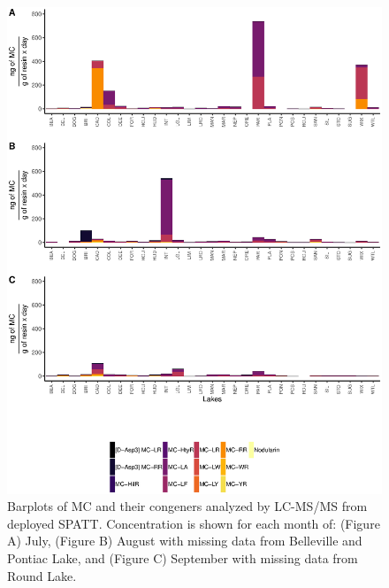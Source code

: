 \begin{figure}[p] 
	\includegraphics[width=\textwidth]{figures/spatter}
	\vspace*{-15mm}
	\caption{Barplots of MC and their congeners analyzed by LC-MS/MS from deployed SPATT. Concentration is shown for each month of:
(Figure A) July,
(Figure B) August with missing data from Belleville and Pontiac Lake, and
(Figure C) September with missing data from Round Lake.}
	\label{fig:spatter}
\end{figure}


